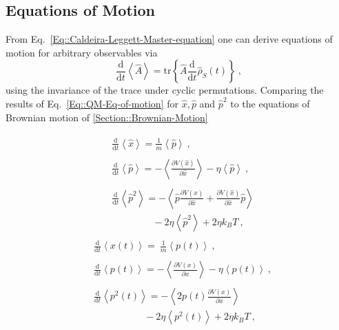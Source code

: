 	\subsection{Equations of Motion}
	From Eq.~\eqref{Eq::Caldeira-Leggett-Master-equation} one can derive equations of motion for arbitrary observables via
	\begin{equation}\label{Eq::QM-Eq-of-motion}
		\frac{\text{d}}{\text{d}t} \left \langle \hat{A} \right \rangle =	\text{tr} \left\{\hat{A} \frac{\text{d}}{\text{d}t } \hat{\rho}_S(t)\right\}~,
	\end{equation}
	using the invariance of the trace under cyclic permutations. Comparing the results of Eq.~\eqref{Eq::QM-Eq-of-motion} for $\hat{x}, \hat{p}$ and $\hat{p}^2$ to the equations of Brownian motion of \autoref{Section::Brownian-Motion}
	\begin{multicols}{2}
		\noindent
		\begin{align*}
			\begin{split}
				&\frac{\text{d}}{\text{d}t} \left \langle \hat{x} \right \rangle =	\frac{1}{m} \left\langle \hat{p} \right \rangle~,
			\end{split}
			\\
			\begin{split}
				&\frac{\text{d}}{\text{d}t} \left \langle \hat{p} \right \rangle = - 	\left\langle  \frac{\partial V(\hat{x})}{\partial \hat{x}} \right \rangle - \eta \left \langle \hat{p} \right \rangle ~,
			\end{split}
			\\
			\begin{split}
				&\frac{\text{d}}{\text{d}t} \left \langle \hat{p}^2 \right \rangle =	- \left\langle \hat{p} \frac{\partial V(\hat{x})}{\partial \hat{x}} + \frac{\partial V(\hat{x})}{\partial \hat{x}} \hat{p} \right \rangle \\
				&\qquad \qquad ~- 2 \eta \left \langle \hat{p}^2 \right \rangle + 2 \eta k_B T ~,
			\end{split}
		\end{align*}
		\begin{align*}
			\begin{split}
				&\frac{\text{d}}{\text{d}t} \left \langle {x}(t) \right \rangle  =	~\frac{1}{m} \left \langle {p}(t) \right \rangle ~,
			\end{split}
			\\
			\begin{split}
				&\frac{\text{d}}{\text{d}t} \left \langle {p}(t) \right \rangle =	- 	\left \langle \frac{\partial V({x})}{\partial {x}} \right \rangle - \eta \left \langle {p}(t) \right \rangle ~,
			\end{split}
			\\
			\begin{split}
				&\frac{\text{d}}{\text{d}t} \left \langle {p}^2(t) \right \rangle = - \left\langle 2 {p}(t) \frac{\partial V({x})}{\partial {x}}\right \rangle \\
				&\qquad \qquad \quad ~ - 2 \eta \left \langle {p}^2(t) \right \rangle + 2 \eta k_B T~,
			\end{split}
		\end{align*}
	\end{multicols}
